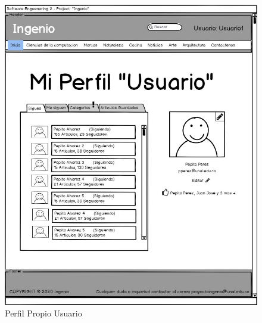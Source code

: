 \documentclass[a4paper,12 pt]{article}
\begin{document}
\begin{figure}[H]
    \centering
    \includegraphics[scale = 0.7]{images/PerfilPropioUsuario.jpg}
    \caption{Perfil Propio Usuario}
    \label{F105}
\end{figure}{}
\end{document}
